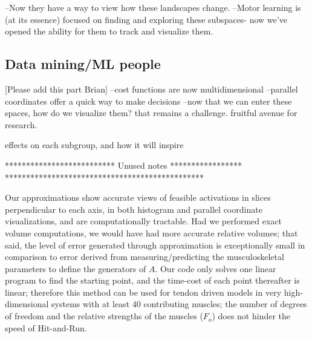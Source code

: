 %
%
%


--Now they have a way to view how these landscapes change. 
--Motor learning is (at its essence) focused on finding and exploring these subspaces- now we've opened the ability for them to track and visualize them.

\subsection*{Data mining/ML people}
[Please add this part Brian]
--cost functions are now multidimensional
--parallel coordinates offer a quick way to make decisions
--now that we can enter these spaces, how do we visualize them? that remains a challenge. fruitful avenue for research.

effects on each subgroup, and how it will inspire



************************** Unused notes *****************
***********************************************





Our approximations show accurate views of feasible activations in slices perpendicular to each axis, in both histogram and parallel coordinate visualizations, and are computationally tractable.
Had we performed exact volume computations, we would have had more accurate relative volumes; that said, the level of error generated through approximation is exceptionally small in comparison to error derived from measuring/predicting the musculoskeletal parameters to define the generators of $A$.
Our code only solves one linear program to find the starting point, and the time-cost of each point thereafter is linear; therefore this method can be used for tendon driven models in very high-dimensional systems with at least 40 contributing muscles; the number of degrees of freedom and the relative strengths of the muscles ($F_o$) does not hinder the speed of Hit-and-Run.\\

